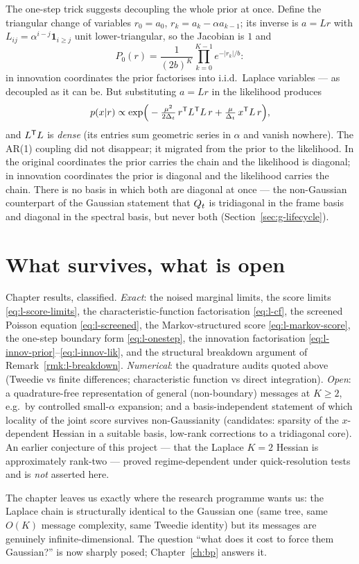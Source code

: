 The one-step trick suggests decoupling the whole prior at once. Define the
triangular change of variables $r_0 = a_0$, $r_k = a_k - \alpha a_{k-1}$;
its inverse is $a = L r$ with $L_{ij} = \alpha^{i-j} \mathbf{1}_{i \geq j}$
unit lower-triangular, so the Jacobian is $1$ and
\begin{equation}
  P_0(r) = \frac{1}{(2b)^K} \prod_{k=0}^{K-1} e^{-|r_k|/b} :
  \label{eq:l-innov-prior}
\end{equation}
in innovation coordinates the prior factorises into i.i.d.\ Laplace
variables --- as decoupled as it can be. But substituting $a = Lr$ in the
likelihood produces
\begin{equation}
  p(x | r) \propto \exp\!\Big(
    -\tfrac{\mu^2}{2\Delta_t}\, r^{\mathsf{T}} L^{\mathsf{T}} L\, r
    + \tfrac{\mu}{\Delta_t}\, x^{\mathsf{T}} L\, r \Big),
  \label{eq:l-innov-lik}
\end{equation}
and $L^{\mathsf{T}} L$ is \emph{dense} (its entries sum geometric series in $\alpha$
and vanish nowhere). The AR(1) coupling did not disappear; it migrated from
the prior to the likelihood. In the original coordinates the prior carries
the chain and the likelihood is diagonal; in innovation coordinates the
prior is diagonal and the likelihood carries the chain. There is no basis
in which both are diagonal at once --- the non-Gaussian counterpart of the
Gaussian statement that $Q_t$ is tridiagonal in the frame basis and
diagonal in the spectral basis, but never both
(Section~\ref{sec:g-lifecycle}).

\section{What survives, what is open}

Chapter results, classified. \emph{Exact}: the noised marginal limits, the
score limits \eqref{eq:l-score-limits}, the characteristic-function
factorisation \eqref{eq:l-cf}, the screened Poisson equation
\eqref{eq:l-screened}, the Markov-structured score
\eqref{eq:l-markov-score}, the one-step boundary form
\eqref{eq:l-onestep}, the innovation factorisation
\eqref{eq:l-innov-prior}--\eqref{eq:l-innov-lik}, and the structural
breakdown argument of Remark~\ref{rmk:l-breakdown}. \emph{Numerical}: the
quadrature audits quoted above (Tweedie vs finite differences;
characteristic function vs direct integration). \emph{Open}: a
quadrature-free representation of general (non-boundary) messages at
$K \geq 2$, e.g.\ by controlled small-$\alpha$ expansion; and a
basis-independent statement of which locality of the joint score survives
non-Gaussianity (candidates: sparsity of the $x$-dependent Hessian in a
suitable basis, low-rank corrections to a tridiagonal core). An earlier
conjecture of this project --- that the Laplace $K = 2$ Hessian is
approximately rank-two --- proved regime-dependent under quick-resolution
tests and is \emph{not} asserted here.

The chapter leaves us exactly where the research programme wants us: the
Laplace chain is structurally identical to the Gaussian one (same tree,
same $O(K)$ message complexity, same Tweedie identity) but its messages are
genuinely infinite-dimensional. The question ``what does it cost to force
them Gaussian?'' is now sharply posed; Chapter~\ref{ch:bp} answers it.
